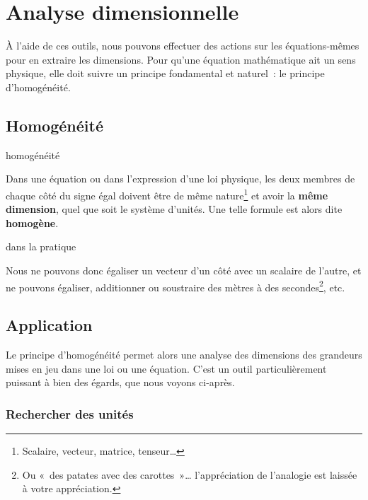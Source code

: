 \documentclass[../main/main.tex]{subfiles}
\begin{document}
\section{Analyse dimensionnelle}

À l'aide de ces outils, nous pouvons effectuer des actions sur les
équations-mêmes pour en extraire les dimensions. Pour qu'une équation
mathématique ait un sens physique, elle doit suivre un principe fondamental et
naturel~: le principe d'homogénéité.

\subsection{Homogénéité}

\begin{tcbraster}[raster columns=2, raster equal height=rows]
	\begin{prop}[label=prop:homo, hand]{homogénéité}

		Dans une équation ou dans l'expression d'une loi physique, les deux
		membres de chaque côté du signe égal doivent être de même
		nature\footnote{Scalaire, vecteur, matrice, tenseur…} et avoir la
		\textbf{même dimension}, quel que soit le système d'unités. Une telle
		formule est alors dite \textbf{homogène}.

	\end{prop}
	\begin{impl}[label=impl:homo]{dans la pratique}

		Nous ne pouvons donc égaliser un vecteur d'un côté avec un scalaire de
		l'autre, et ne pouvons égaliser, additionner ou soustraire des mètres à
		des secondes\footnote{Ou «~des patates avec des carottes~»…
			l'appréciation de l'analogie est laissée à votre appréciation.}, etc.

	\end{impl}
\end{tcbraster}

\subsection{Application}

Le principe d'homogénéité permet alors une analyse des dimensions des grandeurs
mises en jeu dans une loi ou une équation. C'est un outil particulièrement
puissant à bien des égards, que nous voyons ci-après.

\subsubsection{Rechercher des unités}
\end{document}
